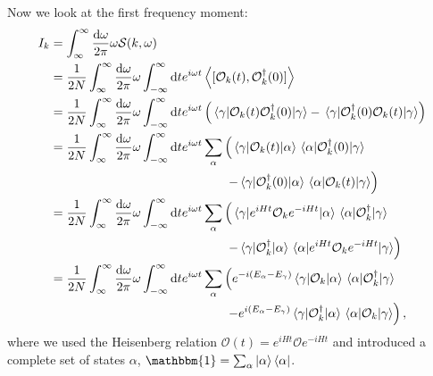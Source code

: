 \documentclass[11pt, a4paper]{report} %
\newcommand{\operator}{\mathcal{O}}
\begin{document}
Now we look at the first frequency moment:
\begin{align}
  I_k &= \int_{\infty}^{\infty}\frac{\dd \omega}{2\pi} \omega \mathcal{S}(k,\omega)\\
  &= \frac{1}{2N} \int_{\infty}^{\infty}\frac{\dd \omega}{2\pi} \omega \int_{-\infty}^{\infty} \dd t e^{i\omega t} \expval{[\operator_k(t),\operator_{k}^{\dagger}(0)]}\\
&= \frac{1}{2N} \int_{\infty}^{\infty}\frac{\dd \omega}{2\pi} \omega \int_{-\infty}^{\infty} \dd t e^{i\omega t} \left(\matrixel{\gamma}{\operator_k(t)\operator_{k}^{\dagger}(0)}{\gamma} - \matrixel{\gamma}{\operator_{k}^{\dagger}(0)\operator_k(t)}{\gamma}\right) \\
&= \frac{1}{2N} \int_{\infty}^{\infty}\frac{\dd \omega}{2\pi} \omega \int_{-\infty}^{\infty} \dd t e^{i\omega t} \sum_{\alpha} \left(\matrixel{\gamma}{\operator_k(t)}{\alpha}\matrixel{\alpha}{\operator_{k}^{\dagger}(0)}{\gamma} \right.\nonumber\\
&\qquad\qquad\qquad\qquad\qquad\qquad\qquad\left.- \matrixel{\gamma}{\operator_{k}^{\dagger}(0)}{\alpha}\matrixel{\alpha}{\operator_k(t)}{\gamma}\right)\\
&= \frac{1}{2N} \int_{\infty}^{\infty}\frac{\dd \omega}{2\pi} \omega \int_{-\infty}^{\infty} \dd t e^{i\omega t} \sum_{\alpha} \left(\matrixel{\gamma}{e^{iHt}\operator_ke^{-iHt}}{\alpha}\matrixel{\alpha}{\operator_{k}^{\dagger}}{\gamma} \right.\nonumber\\
&\qquad\qquad\qquad\qquad\qquad\qquad\qquad\left.- \matrixel{\gamma}{\operator_{k}^{\dagger}}{\alpha}\matrixel{\alpha}{e^{iHt}\operator_ke^{-iHt}}{\gamma}\right)\\
&= \frac{1}{2N} \int_{\infty}^{\infty}\frac{\dd \omega}{2\pi} \omega \int_{-\infty}^{\infty} \dd t e^{i\omega t} \sum_{\alpha} \left(e^{-i(E_{\alpha}-E_{\gamma})}\matrixel{\gamma}{\operator_k}{\alpha}\matrixel{\alpha}{\operator_{k}^{\dagger}}{\gamma} \right.\nonumber\\ 
&\qquad\qquad\qquad\qquad\qquad\qquad\qquad\left.- e^{i(E_{\alpha}-E_{\gamma})}\matrixel{\gamma}{\operator_{k}^{\dagger}}{\alpha}\matrixel{\alpha}{\operator_k}{\gamma}\right), \label{eq:fourierfreqmoment}
\end{align}
where we used the Heisenberg relation \(\mathcal{O}(t) = e^{iHt}\mathcal{O}e^{-iHt}\) and introduced a complete set of states \(\alpha\), \(\mathbbm{1}=\sum_{\alpha}\ket{\alpha}\bra{\alpha}\).
\end{document}
